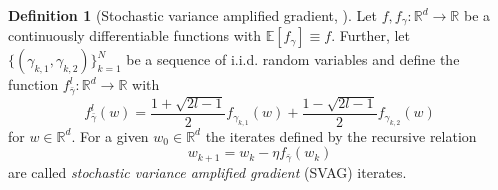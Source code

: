 \documentclass[12pt]{article}
\theoremstyle{definition}
\newtheorem{definition}[definition]{Definition}
\numberwithin{equation}{section}
\newcommand{\R}{\mathbb{R}}
\newcommand{\ev}[1]{\mathbb{E}\left[{#1}\right]}
\begin{document}
\begin{definition}[Stochastic variance amplified gradient, \cite{liValidityModelingSGD2021}]
  Let $f, f_{\gamma} : \R^d \rightarrow \R$ be a continuously differentiable functions with $\ev{f_{\gamma}} \equiv f$. Further, let $\{(\gamma_{k,1}, \gamma_{k,2})\}_{k=1}^N$ be a sequence of i.i.d. random variables and define the function $f^l_{\bar{\gamma}} : \R^d \rightarrow \R$ with
  \begin{equation*}
    f^l_{\bar{\gamma}}(w) =  \frac{1+\sqrt{2l - 1}}{2}f_{\gamma_{k,1}}(w) + \frac{1-\sqrt{2l - 1}}{2}f_{\gamma_{k,2}}(w)
  \end{equation*}
  for $w \in \R^d$.
    For a given $w_{0} \in \R^d$ the iterates defined by the recursive relation
  \begin{equation*}
    w_{k+1} = w_{k} - \eta f_{\bar{\gamma}}(w_{k})
  \end{equation*}
  are called \emph{stochastic variance amplified gradient} (SVAG) iterates.
\end{definition}
\end{document}
